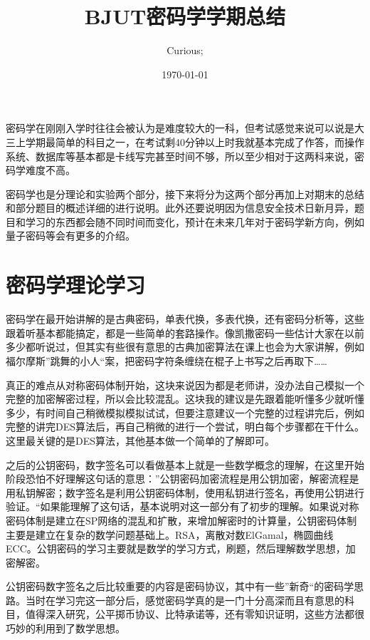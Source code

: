 \documentclass[UTF8]{ctexart}
\begin{document}

\title{BJUT密码学学期总结}  %
\author{Curious;}  %
\date{\today}    %
\maketitle     %

\large{密码学在刚刚入学时往往会被认为是难度较大的一科，但考试感觉来说可以说是大三上学期最简单的科目之一，在考试剩40分钟以上时我就基本完成了作答，而操作系统、数据库等基本都是卡线写完甚至时间不够，所以至少相对于这两科来说，密码学难度不高。

密码学也是分理论和实验两个部分，接下来将分为这两个部分再加上对期末的总结和部分题目的概述详细的进行说明。此外还要说明因为信息安全技术日新月异，题目和学习的东西都会随不同时间而变化，预计在未来几年对于密码学新方向，例如量子密码等会有更多的介绍。}
\tableofcontents  %

\newpage
\section{密码学理论学习}%
\large{密码学在最开始讲解的是古典密码，单表代换，多表代换，还有密码分析等，这些跟着听基本都能搞定，都是一些简单的套路操作。像凯撒密码一些估计大家在以前多少都听说过，但其实有些很有意思的古典加密算法在课上也会为大家讲解，例如福尔摩斯”跳舞的小人“案，把密码字符条缠绕在棍子上书写之后再取下……

真正的难点从对称密码体制开始，这块来说因为都是老师讲，没办法自己模拟一个完整的加密解密过程，所以会比较混乱。这块我的建议是先跟着能听懂多少就听懂多少，有时间自己稍微模拟模拟试试，但要注意建议一个完整的过程讲完后，例如完整的讲完DES算法后，再自己稍微的进行一个尝试，明白每个步骤都在干什么。这里最关键的是DES算法，其他基本做一个简单的了解即可。

之后的公钥密码，数字签名可以看做基本上就是一些数学概念的理解，在这里开始阶段恐怕不好理解这句话的意思：”公钥密码加密流程是用公钥加密，解密流程是用私钥解密；数字签名是利用公钥密码体制，使用私钥进行签名，再使用公钥进行验证。“如果能理解了这句话，基本说明对这一部分有了初步的理解。如果说对称密码体制是建立在SP网络的混乱和扩散，来增加解密时的计算量，公钥密码体制主要是建立在复杂的数学问题基础上。RSA，离散对数ElGamal，椭圆曲线ECC。公钥密码的学习主要就是数学的学习方式，刷题，然后理解数学思想，加密解密。

公钥密码数字签名之后比较重要的内容是密码协议，其中有一些”新奇“的密码学思路。当时在学习完这一部分后，感觉密码学真的是一门十分高深而且有意思的科目，值得深入研究，公平掷币协议、比特承诺等，还有零知识证明，这些方法都很巧妙的利用到了数学思想。}
\end{document}

